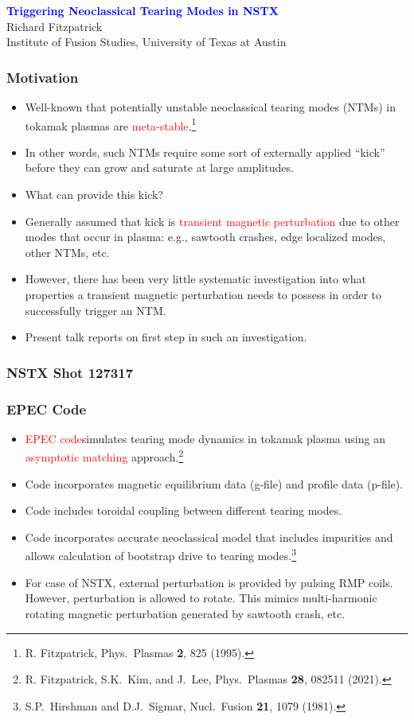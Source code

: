 \documentclass{beamer}
\newcommand{\blue}[1]{\textcolor{blue}{#1}}
\newcommand{\red}[1]{\textcolor{red}{#1}}
\begin{document}
\begin{frame}
\begin{center}
\blue{\Large\bf Triggering Neoclassical Tearing Modes in NSTX}\\[2ex]
Richard Fitzpatrick\\[0.5ex]
Institute of Fusion Studies, University of Texas at Austin
\end{center}


\end{frame}

\begin{frame}
\frametitle{Motivation}
 
\begin{itemize}
\item Well-known that potentially unstable neoclassical tearing modes (NTMs) in tokamak plasmas are \red{meta-stable}.\footnote{R. Fitzpatrick, 
Phys.\ Plasmas {\bf 2}, 825 (1995).}
\item In other words, such NTMs require some sort of externally applied ``kick'' before they can grow and saturate at large amplitudes.
\item What can provide this kick? 
\item Generally assumed that kick is \red{transient magnetic perturbation} due to other modes that occur in plasma: e.g., sawtooth crashes, edge localized modes, other NTMs, etc.
\item However, there has been very little systematic investigation into what properties a transient magnetic
perturbation needs to possess in order to successfully trigger an NTM. 
\item Present talk reports on first step in such an investigation. 
\end{itemize}
\end{frame}

\begin{frame}
\frametitle{NSTX Shot 127317}
\frametitle{EPEC Code}
 
\begin{itemize}
\item \red{EPEC code}simulates tearing mode dynamics in tokamak plasma using an \red{asymptotic matching} approach.\footnote{R. Fitzpatrick, S.K.~Kim, and J.~Lee, Phys.\ Plasmas {\bf 28}, 082511 (2021).}  
\item Code incorporates magnetic equilibrium data (g-file) and profile data (p-file). 
\item Code includes toroidal coupling between different tearing modes. 
\item Code incorporates accurate neoclassical model that includes impurities and allows calculation of bootstrap
drive to tearing modes.\footnote{S.P.~Hirshman and D.J.~Sigmar, Nucl.\ Fusion {\bf 21}, 1079 (1981).} 
\item For case of NSTX, external perturbation is provided by pulsing RMP coils. However, perturbation is allowed to rotate.
This mimics multi-harmonic rotating magnetic perturbation generated by sawtooth crash, etc.
\end{itemize}
\end{frame}
\end{document}
